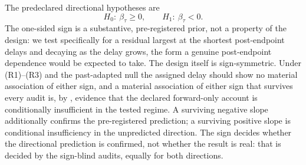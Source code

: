 \documentclass[11pt,a4paper]{article}
\theoremstyle{definition}
\begin{document}
The predeclared directional hypotheses are
\begin{equation}
\label{eq:hypotheses}
H_0:\ \beta_\tau\geq0,
\qquad
H_1:\ \beta_\tau<0 .
\end{equation}
The one-sided sign is a substantive, pre-registered prior, not a property of
the design: we test specifically for a residual largest at the shortest
post-endpoint delays and decaying as the delay grows, the form a genuine
post-endpoint dependence would be expected to take. The design itself is
sign-symmetric. Under (R1)--(R3) and the past-adapted null the assigned delay
should show no material association of either sign, and a material association of
either sign that survives every audit is, by , evidence that
the declared forward-only account is conditionally insufficient in the tested
regime. A surviving negative slope additionally confirms the pre-registered
prediction; a surviving positive slope is conditional insufficiency in the
unpredicted direction. The sign decides whether the directional prediction is
confirmed, not whether the result is real: that is decided by the sign-blind
audits, equally for both directions.
\end{document}

